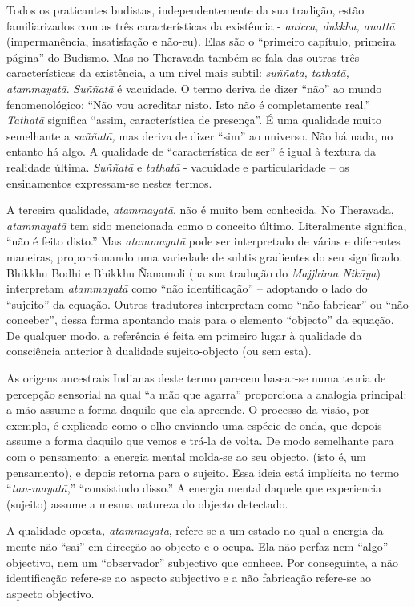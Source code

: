 Todos os praticantes budistas, independentemente da sua tradição, estão
familiarizados com as três características da existência - \emph{anicca,
dukkha, anattā} (impermanência, insatisfação e não-eu). Elas são o
``primeiro capítulo, primeira página'' do Budismo. Mas no Theravada
também se fala das outras três características da existência, a um nível
mais subtil: \emph{suññata, tathatā, atammayatā}. \emph{Suññatā} é
vacuidade. O termo deriva de dizer ``não'' ao mundo fenomenológico:
``Não vou acreditar nisto. Isto não é completamente
real.'' \emph{Tathatā} significa ``assim, característica de presença''.
É uma qualidade muito semelhante a \emph{suññatā,}  mas deriva de dizer
``sim'' ao universo. Não há nada, no entanto há algo. A qualidade de
``característica de ser'' é igual à textura da realidade última.
\emph{Suññatā} e \emph{tathatā} - vacuidade e particularidade  -- os
ensinamentos expressam-se nestes termos.

A terceira qualidade,   \emph{atammayatā}, não é muito bem conhecida. No
Theravada,  \emph{atammayatā} tem sido mencionada como o conceito
último. Literalmente significa, ``não é feito disto.'' Mas
\emph{atammayatā} pode ser interpretado de várias e diferentes maneiras,
proporcionando uma variedade de subtis gradientes do seu significado.
Bhikkhu Bodhi e Bhikkhu Ñanamoli (na sua tradução do \emph{Majjhima
Nikāya}) interpretam \emph{atammayatā}  como ``não identificação'' --
 adoptando o lado do ``sujeito'' da equação. Outros tradutores
interpretam como ``não fabricar'' ou ``não conceber'', dessa forma
apontando mais para o elemento ``objecto'' da equação. De qualquer modo,
a referência é feita em primeiro lugar à qualidade da consciência
anterior à dualidade sujeito-objecto (ou sem esta). 

As origens ancestrais Indianas deste termo parecem basear-se numa teoria
de percepção sensorial na qual ``a mão que agarra'' proporciona a
analogia principal: a mão assume a forma daquilo que ela apreende. O
processo da visão, por exemplo, é explicado como o olho enviando uma
espécie de onda, que depois assume a forma daquilo que vemos e trá-la de
volta. De modo semelhante para com o pensamento: a energia mental
molda-se ao seu objecto, (isto é, um pensamento), e depois retorna para
o sujeito. Essa ideia está implícita no termo ``\emph{tan-mayatā},''
``consistindo disso.'' A energia mental daquele que experiencia
(sujeito) assume a mesma natureza do objecto detectado.

A qualidade oposta\emph{, atammayatā}, refere-se a um estado no qual a
energia da mente não ``sai'' em direcção ao objecto e o ocupa. Ela não
perfaz nem ``algo'' objectivo, nem um ``observador'' subjectivo que
conhece. Por conseguinte, a não identificação refere-se ao aspecto
subjectivo e a não fabricação refere-se ao aspecto objectivo.

